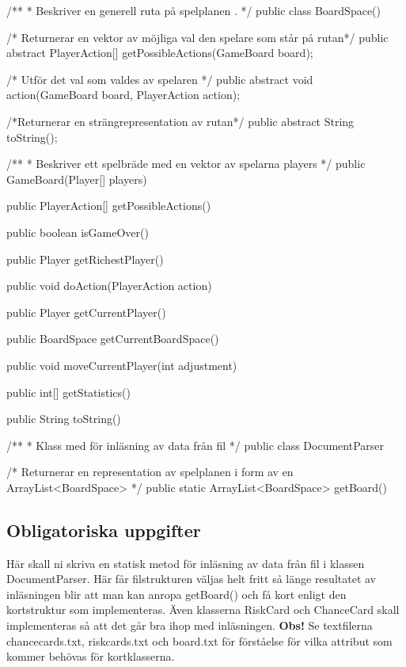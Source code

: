 \begin{Code}
/**
 * Beskriver en generell ruta på spelplanen .
 */
public class BoardSpace(){

/* Returnerar en vektor av möjliga val den spelare som står på rutan*/
public abstract PlayerAction[] getPossibleActions(GameBoard board);

/* Utför det val som valdes av spelaren */
public abstract void action(GameBoard board, PlayerAction action);

/*Returnerar en strängrepresentation av rutan*/
public abstract String toString();

}

\end{Code}

\begin{Code}
/**
 * Beskriver ett spelbräde med en vektor av spelarna players
 */
public GameBoard(Player[] players) {

public PlayerAction[] getPossibleActions()

public boolean isGameOver()

public Player getRichestPlayer()

public void doAction(PlayerAction action)

public Player getCurrentPlayer()

public BoardSpace getCurrentBoardSpace()

public void moveCurrentPlayer(int adjustment)

public int[] getStatistics()

public String toString()

}
\end{Code}

\begin{Code}
/**
 * Klass med för inläsning av data från fil
 */
public class DocumentParser {

/* Returnerar en representation av spelplanen i form av en ArrayList<BoardSpace> */
public static ArrayList<BoardSpace> getBoard()
}

\end{Code}




\subsection{Obligatoriska uppgifter}

\Task Här skall ni skriva en statisk metod för inläsning av data från fil i klassen DocumentParser. Här får filstrukturen väljas helt fritt så länge resultatet av inläsningen blir att man kan anropa getBoard() och få kort enligt den kortstruktur som implementeras. Även klasserna RiskCard och ChanceCard skall implementeras så att det går bra ihop med inläsningen.\newline
\textbf{Obs!} Se textfilerna chancecards.txt, riskcards.txt och board.txt för förståelse för vilka attribut som kommer behövas för kortklasserna. 

